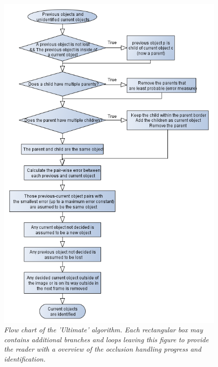 \newpage
\begin{figure}[htb]
	\centering
	\includegraphics[width=123.5mm]{images/data_flow_identification.png}
	\caption{\textit{Flow chart of the 'Ultimate' algorithm. Each rectangular box may contains additional branches and loops leaving this figure to provide the reader with a overview of the occlusion handling progress and identification.}}
	\label{fig:ObjID_fig} %
\end{figure}
